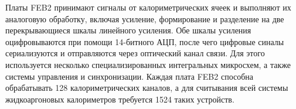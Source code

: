 Платы FEB2 принимают сигналы от калориметрических ячеек и выполняют их аналоговую обработку, включая усиление, формирование и разделение на две перекрывающиеся шкалы линейного усиления. Обе шкалы усиления оцифровываются при помощи 14-битного АЦП, после чего цифровые синалы сериализуются и отправляются через оптический канал связи. Для этого используется несколько специализированных интегральных микросхем, а также системы управления и синхронизации. Каждая плата FEB2 способна обрабатывать 128 калориметрических каналов, а для считывания всей системы жидкоаргоновых калориметров требуется 1524 таких устройств.\par
